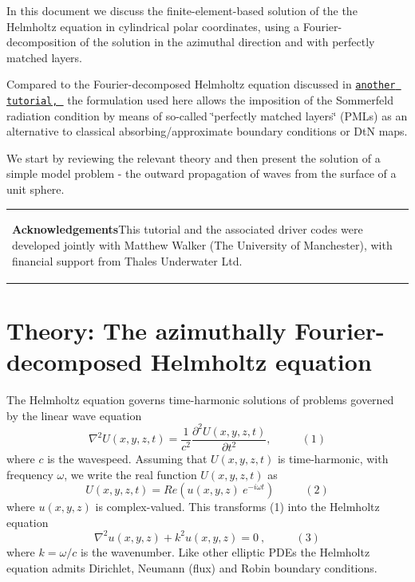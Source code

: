 In this document we discuss the finite-\/element-\/based solution of the the Helmholtz equation in cylindrical polar coordinates, using a Fourier-\/decomposition of the solution in the azimuthal direction and with perfectly matched layers.

Compared to the Fourier-\/decomposed Helmholtz equation discussed in \href{../../../fourier_decomposed_helmholtz/sphere_scattering/html/index.html}{\tt another tutorial, } the formulation used here allows the imposition of the Sommerfeld radiation condition by means of so-\/called \char`\"{}perfectly matched layers\char`\"{} (P\+M\+Ls) as an alternative to classical absorbing/approximate boundary conditions or DtN maps.

We start by reviewing the relevant theory and then present the solution of a simple model problem -\/ the outward propagation of waves from the surface of a unit sphere.

\tabulinesep=1mm
\begin{longtabu} spread 0pt [c]{*{1}{|X[-1]}|}
\hline
\begin{center} {\bfseries Acknowledgements}This tutorial and the associated driver codes were developed jointly with Matthew Walker (The University of Manchester), with financial support from Thales Underwater Ltd. \end{center} 

\\
\end{longtabu}




\hypertarget{index_theory}{}\section{Theory\+: The azimuthally Fourier-\/decomposed Helmholtz equation}\label{index_theory}
The Helmholtz equation governs time-\/harmonic solutions of problems governed by the linear wave equation \[ \nabla^2 U(x,y,z,t) = \frac{1}{c^2} \frac{\partial^2 U(x,y,z,t)}{\partial t^2}, \ \ \ \ \ \ \ \ \ \ \ \ (1) \] where $ c $ is the wavespeed. Assuming that $ U(x,y,z,t) $ is time-\/harmonic, with frequency $ \omega $, we write the real function $ U(x,y,z,t) $ as \[ U(x,y,z,t) = Re (u(x,y,z) \ e^{-i \omega t}) \ \ \ \ \ \ \ \ \ \ \ \ (2) \] where $ u(x,y,z) $ is complex-\/valued. This transforms (1) into the Helmholtz equation \[ \nabla^2 u(x,y,z) + k^2 u(x,y,z) = 0 \ , \ \ \ \ \ \ \ \ \ \ \ \ (3) \] where $ k = \omega/c $ is the wavenumber. Like other elliptic P\+D\+Es the Helmholtz equation admits Dirichlet, Neumann (flux) and Robin boundary conditions.

